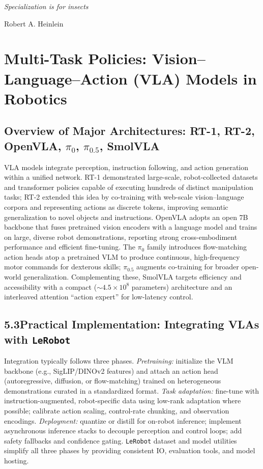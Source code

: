 \epigraph{\textit{Specialization is for insects}}{Robert A. Heinlein}

\section{Multi-Task Policies: Vision–Language–Action (VLA) Models in Robotics}
\label{sec:multi}

\subsection{Overview of Major Architectures: RT-1, RT-2, OpenVLA, $\pi_0$, $\pi_{0.5}$, SmolVLA}
VLA models integrate perception, instruction following, and action generation within a unified network. RT-1 demonstrated large-scale, robot-collected datasets and transformer policies capable of executing hundreds of distinct manipulation tasks; RT-2 extended this idea by co-training with web-scale vision–language corpora and representing actions as discrete tokens, improving semantic generalization to novel objects and instructions. OpenVLA adopts an open 7B backbone that fuses pretrained vision encoders with a language model and trains on large, diverse robot demonstrations, reporting strong cross-embodiment performance and efficient fine-tuning. The $\pi_0$ family introduces flow-matching action heads atop a pretrained VLM to produce continuous, high-frequency motor commands for dexterous skills; $\pi_{0.5}$ augments co-training for broader open-world generalization. Complementing these, SmolVLA targets efficiency and accessibility with a compact (\(\sim\!4.5\times10^8\) parameters) architecture and an interleaved attention ``action expert'' for low-latency control.

\subsection*{5.3\quad Practical Implementation: Integrating VLAs with \texttt{LeRobot}}
Integration typically follows three phases. \emph{Pretraining:} initialize the VLM backbone (e.g., SigLIP/DINOv2 features) and attach an action head (autoregressive, diffusion, or flow-matching) trained on heterogeneous demonstrations curated in a standardized format. \emph{Task adaptation:} fine-tune with instruction-augmented, robot-specific data using low-rank adaptation where possible; calibrate action scaling, control-rate chunking, and observation encodings. \emph{Deployment:} quantize or distill for on-robot inference; implement asynchronous inference stacks to decouple perception and control loops; add safety fallbacks and confidence gating. \texttt{LeRobot} dataset and model utilities simplify all three phases by providing consistent IO, evaluation tools, and model hosting.

